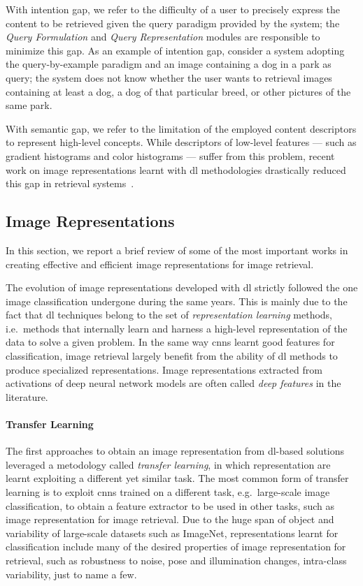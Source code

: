 With intention gap, we refer to the difficulty of a user to precisely express the content to be retrieved given the query paradigm provided by the system;
the \emph{Query Formulation} and \emph{Query Representation} modules are responsible to minimize this gap.
As an example of intention gap, consider a system adopting the query-by-example paradigm and an image containing a dog in a park as query;
the system does not know whether the user wants to retrieval images containing at least a dog, a dog of that particular breed, or other pictures of the same park.

With semantic gap, we refer to the limitation of the employed content descriptors to represent high-level concepts.
While descriptors of low-level features --- such as gradient histograms and color histograms --- suffer from this problem, recent work on image representations learnt with \gls{dl} methodologies drastically reduced this gap in retrieval systems~\cite{donahue2014decaf}.

\subsection{Image Representations}
In this section, we report a brief review of some of the most important works in creating effective and efficient image representations for image retrieval.

The evolution of image representations developed with \gls{dl} strictly followed the one image classification undergone during the same years.
This is mainly due to the fact that \acrlong{dl} techniques belong to the set of \emph{representation learning} methods, i.e.\ methods that internally learn and harness a high-level representation of the data to solve a given problem.
In the same way \glspl{cnn} learnt good features for classification, image retrieval largely benefit from the ability of \gls{dl} methods to produce specialized representations.
Image representations extracted from activations of deep neural network models are often called \emph{deep features} in the literature.

\paragraph{Transfer Learning}
The first approaches to obtain an image representation from \gls{dl}-based solutions leveraged a metodology called \emph{transfer learning}, in which representation are learnt exploiting a different yet similar task.
The most common form of transfer learning is to exploit \glspl{cnn} trained on a different task, e.g.\ large-scale image classification, to obtain a feature extractor to be used in other tasks, such as image representation for image retrieval.
Due to the huge span of object and variability of large-scale datasets such as ImageNet, representations learnt for classification include many of the desired properties of image representation for retrieval, such as robustness to noise, pose and illumination changes, intra-class variability, just to name a few.

